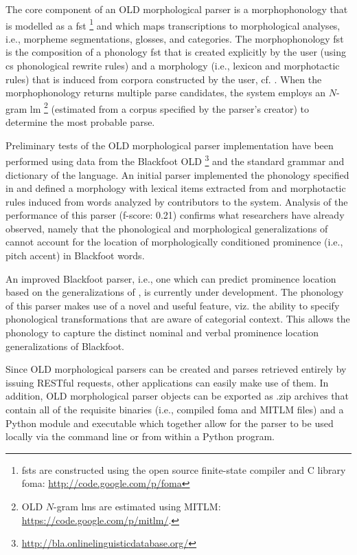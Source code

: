 \documentclass[11pt]{article}
\begin{document}
The core component of an OLD morphological parser is a morphophonology that is
modelled as a \gls{fst}%
\footnote{\glspl{fst} are constructed using the open source finite-state
compiler and C library foma: \url{http://code.google.com/p/foma}} %
and which maps transcriptions to morphological analyses, i.e., morpheme
segmentations, glosses, and categories. The morphophonology \gls{fst} is the
composition of a phonology \gls{fst} that is created explicitly by the user
(using \gls{cs} phonological rewrite rules) and a morphology (i.e., lexicon and
morphotactic rules) that is induced from corpora constructed by the user, cf. 
\cite{beesley2003finite,hulden2012}. When the morphophonology returns multiple
parse candidates, the system employs an $N$-gram \gls{lm}%
\footnote{OLD $N$-gram \glspl{lm} are estimated using MITLM:
\url{https://code.google.com/p/mitlm/}.} %
(estimated from a corpus specified by the parser's creator) to determine the
most probable parse.

Preliminary tests of the OLD morphological parser implementation have been
performed using data from the Blackfoot OLD%
\footnote{\url{http://bla.onlinelinguisticdatabase.org/}} %
and the standard grammar \cite{frantz91} and dictionary \cite{frantz95} of the
language. An initial parser implemented the phonology specified in
\cite{frantz91} and defined a morphology with lexical items extracted from
\cite{frantz95} and morphotactic rules induced from words analyzed by
contributors to the system. Analysis of the performance of this parser
(f-score: 0.21) confirms what researchers \cite{weber2013} have already
observed, namely that the phonological and morphological generalizations of
\cite{frantz91} cannot account for the location of morphologically conditioned
prominence (i.e., pitch accent) in Blackfoot words.

An improved Blackfoot parser, i.e., one which can predict prominence location
based on the generalizations of \cite{weber2013}, is currently under
development. The phonology of this parser makes use of a novel and useful
feature, viz. the ability to specify phonological transformations that are
aware of categorial context. This allows the phonology to capture the distinct
nominal and verbal prominence location generalizations of Blackfoot.

Since OLD morphological parsers can be created and parses retrieved entirely by
issuing RESTful requests, other applications can easily make use of them. In
addition, OLD morphological parser objects can be exported as .zip archives
that contain all of the requisite binaries (i.e., compiled foma and MITLM
files) and a Python module and executable which together allow for the parser
to be used locally via the command line or from within a Python program.
\end{document}
